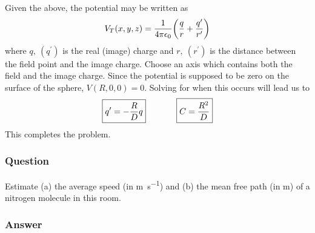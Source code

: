 Given the above, the potential may be written as
\begin{equation*}
  	V_T(x,y,z) = \frac{1}{4\pi \epsilon_0}\qty(\frac{q}{r} + \frac{q^\prime}{r^\prime})
\end{equation*}
where $q,\ (q^\prime)$ is the real (image) charge and $r,\ (r^\prime)$ is the distance between the field point and the image charge. Choose an axis which contains both the field and the image charge. Since the potential is supposed to be zero on the surface of the sphere, $V(R,0,0)=0$. Solving for when this occurs will lead us to
\begin{equation*}
	\boxed{q^\prime = -\frac{R}{D}q}\hspace{.5in} \boxed{C = \frac{R^2}{D}}
\end{equation*}
This completes the problem.
\subsubsection{Question}

Estimate (a) the average speed (in \si{\m\per\s}) and (b) the mean free path
(in \si{\m}) of a nitrogen molecule in this room.

\subsubsection{Answer}

